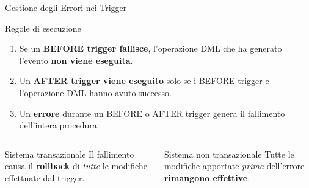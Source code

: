 \documentclass[aspectratio=169]{beamer}
\begin{document}
\begin{frame}{Gestione degli Errori nei Trigger}
  \begin{block}{Regole di esecuzione}
    \begin{enumerate}
      \item Se un \textbf{BEFORE trigger fallisce}, l'operazione DML che ha
            generato l'evento \textbf{non viene eseguita}.
      \item Un \textbf{AFTER trigger viene eseguito} solo se i BEFORE trigger
            e l'operazione DML hanno avuto successo.
      \item Un \textbf{errore} durante un BEFORE o AFTER trigger genera il
            fallimento dell'intera procedura.
    \end{enumerate}
  \end{block}
  \vspace{0.3cm}
  \begin{columns}[T]
      \begin{exampleblock}{Sistema transazionale}
        Il fallimento causa il \textbf{rollback} di \emph{tutte} le modifiche
        effettuate dal trigger.
      \end{exampleblock}
      \begin{alertblock}{Sistema non transazionale}
        Tutte le modifiche apportate \emph{prima} dell'errore
        \textbf{rimangono effettive}.
      \end{alertblock}
  \end{columns}
\end{frame}
\end{document}
